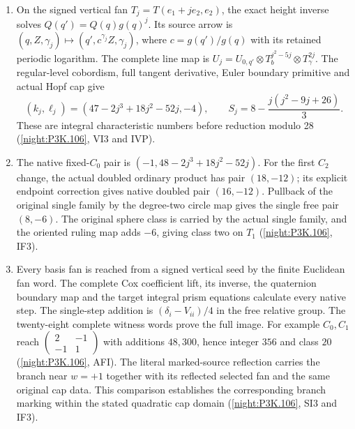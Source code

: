 \begin{enumerate}[label=\arabic*.]
  parameter and line reversal, followed by the physical
  inverse-clutch map of \cref{night:P3K.68}, gives the Jin pair
  $(47,-4)$. The four-edge parameter square retains its root
  and cap phases and subtracts the scalar reference exactly once.
  It identifies the fixed-scalar original positive source loop,
  whose integer is $(4\cdot47+4)/24=8$
  (\cref{night:P3K.106}, ASI3 and IC2).
\item On the signed vertical fan $T_j=T(e_1+je_2,e_2)$,
  the exact height inverse solves $Q(q')=Q(q)g(q)^j$.
  Its source arrow is
  $(q,Z,\gamma_j)\mapsto(q',c^{\gamma_j}Z,\gamma_j)$,
  where $c=g(q')/g(q)$ with its retained periodic logarithm.
  The complete line map is
  $U_j=U_{0,q'}\otimes T_b^{j^2-5j}\otimes T_\gamma^{2j}$.
  The regular-level cobordism, full tangent derivative,
  Euler boundary primitive and actual Hopf cap give
  \[
  (k_j,\ell_j)=(47-2j^3+18j^2-52j,-4),\qquad
  S_j=8-\frac{j(j^2-9j+26)}3.
  \]
  These are integral characteristic numbers before reduction
  modulo 28 (\cref{night:P3K.106}, VI3 and IVP).
\item The native fixed-$C_0$ pair is
  $(-1,48-2j^3+18j^2-52j)$. For the first $C_2$ change,
  the actual doubled ordinary product has pair $(18,-12)$;
  its explicit endpoint correction gives native doubled pair
  $(16,-12)$. Pullback of the original single family by the
  degree-two circle map gives the single free pair $(8,-6)$.
  The original sphere class is carried by the actual single
  family, and the oriented ruling map adds $-6$, giving class
  two on $T_1$ (\cref{night:P3K.106}, IF3).
\item Every basis fan is reached from a signed vertical seed
  by the finite Euclidean fan word. The complete Cox coefficient
  lift, its inverse, the quaternion boundary map and the target
  integral prism equations calculate every native step. The
  single-step addition is $(\delta_i-V_{ii})/4$ in the free
  relative group. The twenty-eight complete witness words prove
  the full image. For example $C_0,C_1$ reach
  $\left(\begin{smallmatrix}2&-1\\-1&1\end{smallmatrix}\right)$
  with additions $48,300$, hence integer $356$ and class $20$
  (\cref{night:P3K.106}, AFI).
  The literal marked-source reflection carries the branch
  near $w=+1$ together with its reflected selected fan and the
  same original cap data. This comparison establishes the
  corresponding branch marking within the stated quadratic
  cap domain (\cref{night:P3K.106}, SI3 and IF3).
\end{enumerate}

